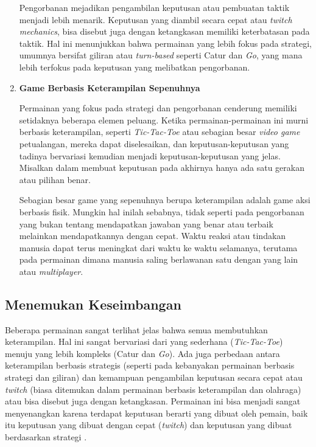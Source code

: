 \begin{enumerate}[label=\textbf{\alph*).}]
	Pengorbanan mejadikan pengambilan keputusan atau pembuatan taktik menjadi lebih menarik. Keputusan yang diambil secara cepat atau \textit{twitch mechanics}, bisa disebut juga dengan ketangkasan memiliki keterbatasan pada taktik. Hal ini menunjukkan bahwa permainan yang lebih fokus pada strategi, umumnya bersifat giliran atau \textit{turn-based} seperti Catur dan \textit{Go}, yang mana lebih terfokus pada keputusan yang melibatkan pengorbanan.
	
	\item \textbf{Game Berbasis Keterampilan Sepenuhnya}
	
	Permainan yang fokus pada strategi dan pengorbanan cenderung memiliki setidaknya beberapa elemen peluang. Ketika permainan-permainan ini murni berbasis keterampilan, seperti \textit{Tic-Tac-Toe} atau sebagian besar \textit{video game} petualangan, mereka dapat diselesaikan, dan keputusan-keputusan yang tadinya bervariasi kemudian menjadi keputusan-keputusan yang jelas. Misalkan dalam membuat keputusan pada akhirnya hanya ada satu gerakan atau pilihan benar.
	\vspace{1ex}
	
	Sebagian besar game yang sepenuhnya berupa keterampilan adalah game aksi berbasis fisik. Mungkin hal inilah sebabnya, tidak seperti pada pengorbanan yang bukan tentang mendapatkan jawaban yang benar atau terbaik melainkan mendapatkannya dengan cepat. Waktu reaksi atau tindakan manusia dapat terus meningkat dari waktu ke waktu selamanya, terutama pada permainan dimana manusia saling berlawanan satu dengan yang lain atau \textit{multiplayer}.
\end{enumerate}

\subsection{Menemukan Keseimbangan}
\label{sec:sub_sec2_keseimbangan}
\vspace{1ex}

Beberapa permainan sangat terlihat jelas bahwa semua membutuhkan keterampilan. Hal ini sangat bervariasi dari yang sederhana (\textit{Tic-Tac-Toe}) menuju yang lebih kompleks (Catur dan \textit{Go}). Ada juga perbedaan antara keterampilan berbasis strategis (seperti pada kebanyakan permainan berbasis strategi dan giliran) dan kemampuan pengambilan keputusan secara cepat atau \textit{twitch} (biasa ditemukan dalam permainan berbasis keterampilan dan olahraga) atau bisa disebut juga dengan ketangkasan. Permainan ini bisa menjadi sangat menyenangkan karena terdapat keputusan berarti yang dibuat oleh pemain, baik itu keputusan yang dibuat dengan cepat (\textit{twitch}) dan keputusan yang dibuat berdasarkan strategi \citep{Brathwaite2009}.
\vspace{1ex}

